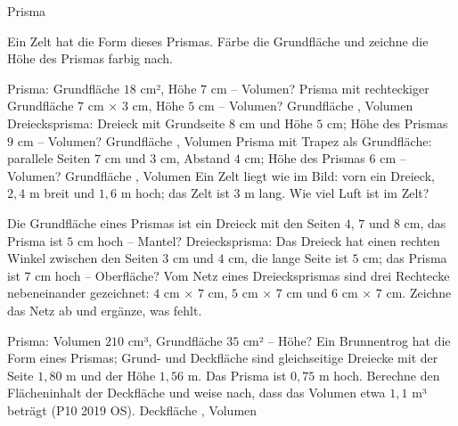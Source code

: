 \setcounter{aufgabe}{19}

\begin{aufgabe}{Prisma}
\begin{teile}
\teil Ein Zelt hat die Form dieses Prismas. Färbe die Grundfläche und zeichne die Höhe des Prismas farbig nach.

\teil Prisma: Grundfläche $18$ cm², Höhe $7$ cm – Volumen? \leerfeld[cm³]
\teil Prisma mit rechteckiger Grundfläche $7$ cm × $3$ cm, Höhe $5$ cm – Volumen? Grundfläche \leerfeld[cm²] , Volumen \leerfeld[cm³]
\teil Dreiecksprisma: Dreieck mit Grundseite $8$ cm und Höhe $5$ cm; Höhe des Prismas $9$ cm – Volumen? Grundfläche \leerfeld[cm²] , Volumen \leerfeld[cm³]
\teil Prisma mit Trapez als Grundfläche: parallele Seiten $7$ cm und $3$ cm, Abstand $4$ cm; Höhe des Prismas $6$ cm – Volumen? Grundfläche \leerfeld[cm²] , Volumen \leerfeld[cm³]
\teil Ein Zelt liegt wie im Bild: vorn ein Dreieck, $2{,}4$ m breit und $1{,}6$ m hoch; das Zelt ist $3$ m lang. Wie viel Luft ist im Zelt?

\leerfeld[m³]
\teil Die Grundfläche eines Prismas ist ein Dreieck mit den Seiten $4$, $7$ und $8$ cm, das Prisma ist $5$ cm hoch – Mantel? \leerfeld[cm²]
\teil Dreiecksprisma: Das Dreieck hat einen rechten Winkel zwischen den Seiten $3$ cm und $4$ cm, die lange Seite ist $5$ cm; das Prisma ist $7$ cm hoch – Oberfläche? \leerfeld[cm²]
\teil Vom Netz eines Dreiecksprismas sind drei Rechtecke nebeneinander gezeichnet: $4$ cm × $7$ cm, $5$ cm × $7$ cm und $6$ cm × $7$ cm. Zeichne das Netz ab und ergänze, was fehlt.

\teil Prisma: Volumen $210$ cm³, Grundfläche $35$ cm² – Höhe? \leerfeld[cm]
\teil Ein Brunnentrog hat die Form eines Prismas; Grund- und Deckfläche sind gleichseitige Dreiecke mit der Seite $1{,}80$ m und der Höhe $1{,}56$ m. Das Prisma ist $0{,}75$ m hoch. Berechne den Flächeninhalt der Deckfläche und weise nach, dass das Volumen etwa $1{,}1$ m³ beträgt \hfill (P10 2019 OS). Deckfläche \leerfeld[m²] , Volumen \leerfeld[m³]
\end{teile}
\end{aufgabe}

